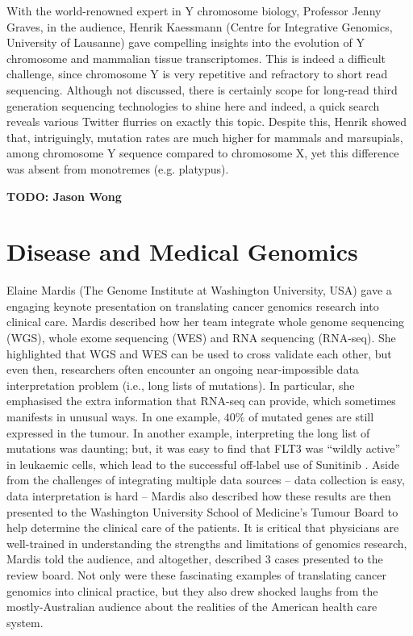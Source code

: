 \documentclass[twocolumn]{bmcart}%
\begin{document}
With the world-renowned expert in Y chromosome biology, Professor Jenny Graves, in the audience, Henrik Kaessmann (Centre for Integrative Genomics, University of Lausanne) gave compelling insights into the evolution of Y chromosome and mammalian tissue transcriptomes.  This is indeed a difficult challenge, since chromosome Y is very repetitive and refractory to short read sequencing. Although not discussed, there is certainly scope for long-read third generation sequencing technologies to shine here and indeed, a quick search reveals various Twitter flurries on exactly this topic.  Despite this, Henrik showed that, intriguingly, mutation rates are much higher for mammals and marsupials, among chromosome Y sequence compared to chromosome X, yet this difference was absent from monotremes (e.g. platypus).

\textbf{TODO: Jason Wong}


\section*{Disease and Medical Genomics}
Elaine Mardis (The Genome Institute at Washington University, USA) gave a engaging keynote presentation on translating cancer genomics research into clinical care. Mardis described how her team integrate whole genome sequencing (WGS), whole exome sequencing (WES) and RNA sequencing (RNA-seq).  She highlighted that WGS and WES can be used to cross validate each other, but even then, researchers often encounter an ongoing near-impossible data interpretation problem (i.e., long lists of mutations).  In particular, she emphasised the extra information that RNA-seq can provide, which sometimes manifests in unusual ways.  In one example, $40\%$ of mutated genes are still expressed in the tumour.  In another example, interpreting the long list of mutations was daunting; but, it was easy to find that FLT3 was ``wildly active'' in leukaemic cells, which lead to the successful off-label use of Sunitinib \cite{NYTIMES}.  Aside from the challenges of integrating multiple data sources -- data collection is easy, data interpretation is hard -- Mardis also described how these results are then presented to the Washington University School of Medicine's Tumour Board to help determine the clinical care of the patients. It is critical that physicians are well-trained in understanding the strengths and limitations of genomics research, Mardis told the audience, and altogether, described 3 cases presented to the review board. Not only were these fascinating examples of translating cancer genomics into clinical practice, but they also drew shocked laughs from the mostly-Australian audience about the realities of the American health care system. 
\end{document}
